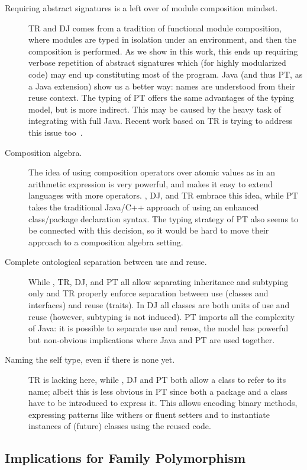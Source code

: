 \begin{description}
\item[Requiring abstract signatures is a left over of module composition mindset.]
TR and DJ comes from a tradition of functional module composition, where 
modules are typed in isolation under an environment, and then the composition is performed.
As we show in this work, this ends up requiring verbose repetition of abstract signatures
which (for highly modularized code) may end up constituting most of the program.
Java (and thus PT, as a Java extension) show us a better way:
names are understood from their reuse context.
The typing of PT offers the same advantages of the \name typing model, 
but is more indirect. This may be caused by the
heavy task of integrating with full Java.
Recent work based on TR is trying to address this issue too~\cite{damiani2017unified}.
\item[Composition algebra.]
The idea of using composition operators over atomic values as in an arithmetic expression is very powerful,
and makes it easy to extend languages with more operators. \name, DJ, and TR embrace this idea, while PT takes the traditional Java/C++ approach of using an enhanced class/package declaration syntax.
The typing strategy of PT also seems to be connected with this
decision, so it would be hard to move their approach
to a composition algebra setting.
\item[Complete ontological separation between use and reuse.]
While \name, TR, DJ, and PT all allow separating inheritance and subtyping only \name and TR properly enforce 
separation between use (classes and interfaces) and reuse (traits).
In DJ all classes are both units of use and reuse (however, subtyping is not induced).
PT imports all the complexity of Java: it is possible to separate use and reuse, the model has powerful but non-obvious implications where Java \Q@extends@ and PT are used together.
\item[Naming the self type, even if there is none yet.]
TR is lacking here, while \name, DJ and PT both allow a class to refer to its name; albeit this is
less obvious in PT since both a package and a class have to be introduced to express it.
This allows encoding binary methods, expressing patterns like withers or fluent setters and to instantiate instances of (future) classes  using the reused code.
\end{description}

\subsection{Implications for Family
Polymorphism}

